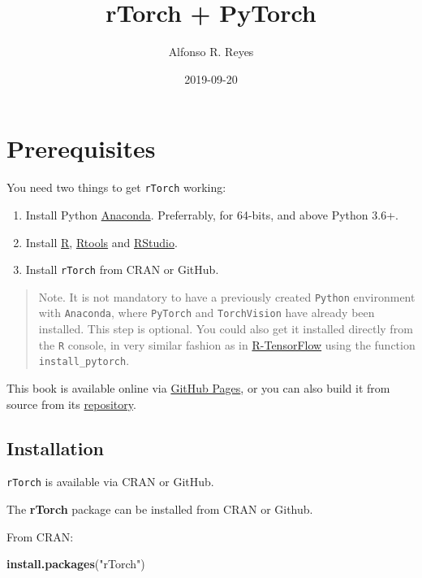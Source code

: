 \documentclass[]{book}
\title{rTorch + PyTorch}
\author{Alfonso R. Reyes}
\date{2019-09-20}
\newenvironment{Shaded}{\begin{snugshade}}{\end{snugshade}}
\newcommand{\KeywordTok}[1]{\textcolor[rgb]{0.13,0.29,0.53}{\textbf{#1}}}
\newcommand{\NormalTok}[1]{#1}
\newcommand{\StringTok}[1]{\textcolor[rgb]{0.31,0.60,0.02}{#1}}
\begin{document}
\maketitle

{
\setcounter{tocdepth}{1}
\tableofcontents
}
\hypertarget{prerequisites}{%
\chapter*{Prerequisites}\label{prerequisites}}

You need two things to get \texttt{rTorch} working:

\begin{enumerate}
\def\labelenumi{\arabic{enumi}.}
\item
  Install Python \href{}{Anaconda}. Preferrably, for 64-bits, and above Python 3.6+.
\item
  Install \href{}{R}, \href{}{Rtools} and \href{}{RStudio}.
\item
  Install \texttt{rTorch} from CRAN or GitHub.
\end{enumerate}

\begin{quote}
Note. It is not mandatory to have a previously created \texttt{Python} environment with \texttt{Anaconda}, where \texttt{PyTorch} and \texttt{TorchVision} have already been installed. This step is optional. You could also get it installed directly from the \texttt{R} console, in very similar fashion as in \href{}{R-TensorFlow} using the function \texttt{install\_pytorch}.
\end{quote}

This book is available online via \href{}{GitHub Pages}, or you can also build it from source from its \href{}{repository}.

\hypertarget{installation}{%
\section*{Installation}\label{installation}}

\texttt{rTorch} is available via CRAN or GitHub.

The \textbf{rTorch} package can be installed from CRAN or Github.

From CRAN:

\begin{Shaded}
\begin{Highlighting}[]
\KeywordTok{install.packages}\NormalTok{(}\StringTok{"rTorch"}\NormalTok{)}
\end{Highlighting}
\end{Shaded}
\end{document}
